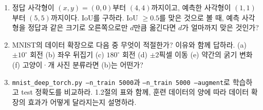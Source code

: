 \documentclass[11pt,a4paper]{article}
\begin{document}
\begin{enumerate}[label=\arabic*.]
\item 정답 사각형이 $(x,y)=(0,0)$부터 $(4,4)$까지이고, 예측한 사각형이 $(1,1)$부터 $(5,5)$까지이다. IoU를 구하라.
IoU $\ge0.5$를 맞은 것으로 볼 때, 예측 사각형을 정답과 같은 크기로 오른쪽으로만 $d$만큼 옮긴다면 $d$가 얼마까지 맞은 것인가?

\item MNIST의 데이터 확장으로 다음 중 무엇이 적절한가? 이유와 함께 답하라.
(a) $\pm10^\circ$ 회전 (b) 좌우 뒤집기 (c) $180^\circ$ 회전 (d) $\pm2$픽셀 이동 (e) 약간의 굵기 변화
(f) 고양이·개 사진 분류라면 (b)는 어떤가?

\item \texttt{mnist\_deep\_torch.py --n\_train 5000}과 \texttt{--n\_train 5000 --augment}로 학습하고 test 정확도를 비교하라.
1.2절의 표와 함께, 훈련 데이터의 양에 따라 데이터 확장의 효과가 어떻게 달라지는지 설명하라.

\end{enumerate}
\end{document}
